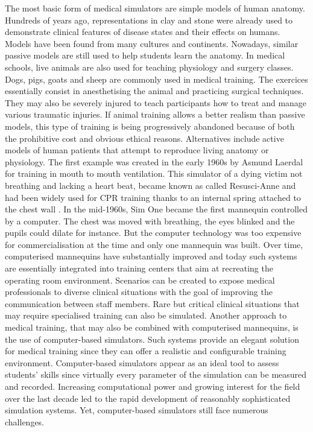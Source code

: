 \bigskip

The most basic form of medical simulators are simple models of human anatomy. Hundreds of years ago, representations in clay and stone were already used to demonstrate clinical features of disease states and their effects on humans. Models have been found from many cultures and continents. Nowadays, similar passive models are still used to help students learn the anatomy. In medical schools, live animals are also used for teaching physiology and surgery classes. Dogs, pigs, goats and sheep are commonly used in medical training. The exercices essentially consist in anesthetising the animal and practicing surgical techniques. They may also be severely injured to teach participants how to treat and manage various traumatic injuries. If animal training allows a better realism than passive models, this type of training is being progressively abandoned because of both the prohibitive cost and obvious ethical reasons. Alternatives include active models of human patients that attempt to reproduce living anatomy or physiology. The first example was created in the early 1960s by Asmund Laerdal for training in mouth to mouth ventilation. This simulator of a dying victim not breathing and lacking a heart beat, became known as called Resusci-Anne and had been widely used for CPR training thanks to an internal spring attached to the chest wall \citep{Cooper04}. In the mid-1960s, Sim One became the first mannequin controlled by a computer. The chest was moved with breathing, the eyes blinked and the pupils could dilate for instance. But the computer technology was too expensive for commercialisation at the time and only one mannequin was built. Over time, computerised mannequins have substantially improved and today such systems are essentially integrated into training centers that aim at recreating the operating room environment. Scenarios can be created to expose medical professionals to diverse clinical situations with the goal of improving the communication between staff members. Rare but critical clinical situations that may require specialised training can also be simulated. Another approach to medical training, that may also be combined with computerised mannequins, is the use of computer-based simulators. Such systems provide an elegant solution for medical training since they can offer a realistic and configurable training environment. Computer-based simulators appear as an ideal tool to assess students' skills since virtually every parameter of the simulation can be measured and recorded. Increasing computational power and growing interest for the field over the last decade led to the rapid development of reasonably sophisticated simulation systems. Yet, computer-based simulators still face numerous challenges. 



